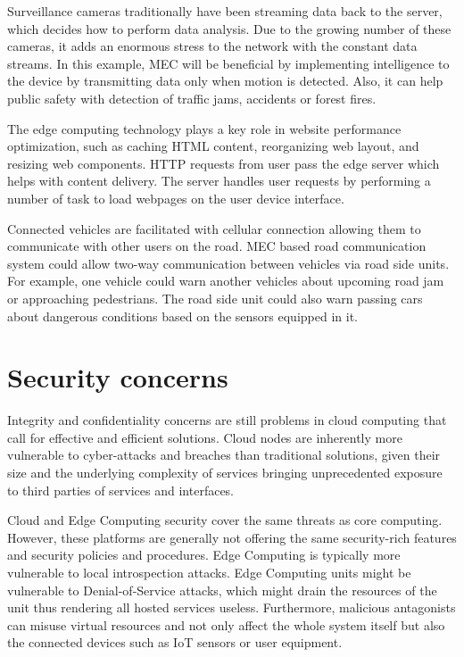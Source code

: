 Surveillance cameras traditionally have been streaming data back to the server, which decides how to perform data analysis. Due to the growing number of these cameras, it adds an enormous stress to the network with the constant data streams. In this example, MEC will be beneficial by implementing intelligence to the device by transmitting data only when motion is detected. Also, it can help public safety with detection of traffic jams, accidents or forest fires.

The edge computing technology plays a key role in website performance optimization, such as caching HTML content, reorganizing web layout, and resizing web components. HTTP requests from user pass the edge server which helps with content delivery. The server handles user requests by performing a number of task to load webpages on the user device interface. \cite{Abbas2018}

Connected vehicles are facilitated with cellular connection allowing them to communicate with other users on the road. MEC based road communication system could allow two-way communication between vehicles via road side units. For example, one vehicle could warn another vehicles about upcoming road jam or approaching pedestrians. The road side unit could also warn passing cars about dangerous conditions based on the sensors equipped in it. \cite{Abbas2018}

\section{Security concerns}
\label{section:security}

Integrity and confidentiality concerns are still problems in cloud computing that call for effective and efficient solutions. Cloud nodes are inherently more vulnerable to cyber-attacks and breaches than traditional solutions, given their size and the underlying complexity of services bringing unprecedented exposure to third parties of services and interfaces. \cite{Lombardi2011}

Cloud and Edge Computing security cover the same threats as core computing. However, these platforms are generally not offering the same security-rich features and security policies and procedures. Edge Computing is typically more vulnerable to local introspection attacks. Edge Computing units might be vulnerable to Denial-of-Service attacks, which might drain the resources of the unit thus rendering all hosted services useless. Furthermore, malicious antagonists can misuse virtual resources and not only affect the whole system itself but also the connected devices such as IoT sensors or user equipment. \cite{EdgeComputing5G}\cite{Abbas2018}


